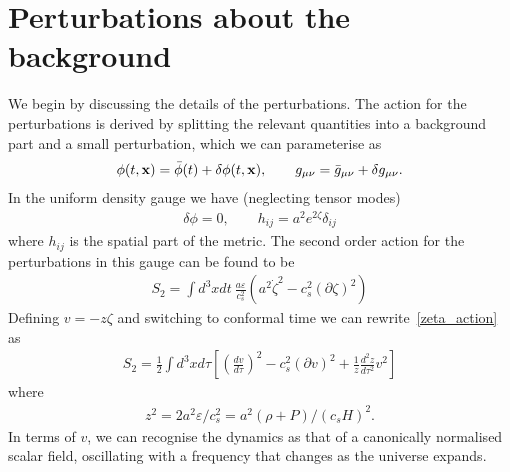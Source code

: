 \section{Perturbations about the background}
    We begin by discussing the details of the perturbations.
    The action for the perturbations is derived by
    splitting the relevant quantities into a background
    part and a small perturbation, which we can parameterise as
    \begin{align}
        \phi(t,\mathbf{x})=\bar{\phi}(t)+\delta\phi(t,\mathbf{x}), \qquad g_{\mu\nu}=\bar{g}_{\mu\nu}+\delta g_{\mu\nu}.
    \end{align}
    In the uniform density gauge we have (neglecting tensor modes)
    \begin{align}
        \delta \phi=0, \qquad h_{ij}=a^2 e^{2\zeta} \delta_{ij}
    \end{align}
    where $h_{ij}$ is the spatial part of the metric.
    The second order action for the perturbations in this gauge can be found to be
    \begin{align}\label{zeta_action}
        S_{2} = \int d^3x dt~\frac{a\varepsilon}{c_s^2}\left(a^2\dot{\zeta}^2-c_s^2\left(\partial\zeta\right)^2\right)
    \end{align}
    Defining $v=-z\zeta$ and switching to conformal time we can rewrite~\eqref{zeta_action} as
    \begin{align}\label{v_action}
        S_{2} = \frac{1}{2}\int d^3x d\tau \left[{\left(\frac{d v}{d \tau}\right)}^2-c_s^2\left(\partial v\right)^2+\frac{1}{z}\frac{d^2z}{d\tau^2}v^2\right]
    \end{align}
    where
    \begin{align}\label{z_defn}
        z^2 = 2a^2\varepsilon/c_s^2 = a^2\left(\rho+P\right)/\left(c_sH\right)^2.
    \end{align}
    In terms of $v$, we can recognise the dynamics as that of a
    canonically normalised scalar field, oscillating
    with a frequency that changes as the universe expands.
